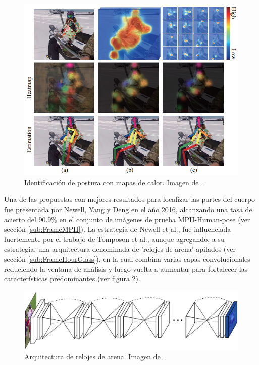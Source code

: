         \begin{figure}[ht!]
        	\centering
        	\includegraphics[width=0.8\linewidth]{imgs/02-Referential/02-HeatMap.PNG}
        	\caption[Identificación de postura con mapas de calor]{Identificación de postura con mapas de calor. Imagen de \cite{Chu2017}. }
    	    \label{fig:HeatMap}
        \end{figure}%
         
        Una de las propuestas con mejores resultados para localizar las partes del cuerpo fue presentada por Newell, Yang y Deng \cite{Newell2016} en el año 2016, alcanzando una tasa de acierto del 90.9\% en el conjunto de imágenes de prueba MPII-Human-pose \cite{MPII2014} (ver sección \ref{sub:FrameMPII}). La estrategia de Newell et al., fue influenciada fuertemente por el trabajo de Tomposon et al.\cite{Tompson2015}, aunque agregando, a su estrategia, una arquitectura denominada de 'relojes de arena' apilados (ver sección \ref{sub:FrameHourGlass}), en la cual combina varias capas convolucionales reduciendo la ventana de análisis y luego vuelta a aumentar para fortalecer las características predominantes (ver figura \ref{fig:StackedHourGlasses}).
        
        \begin{figure}[ht!]
        	\centering
        	\includegraphics[width=0.8\linewidth]{imgs/02-Referential/02-StackedHourGlasses.png}
        	\caption[Arquitectura de relojes de arena]{Arquitectura de relojes de arena. Imagen de \cite{Newell2016}.}
    	    \label{fig:StackedHourGlasses}
        \end{figure}%
        
